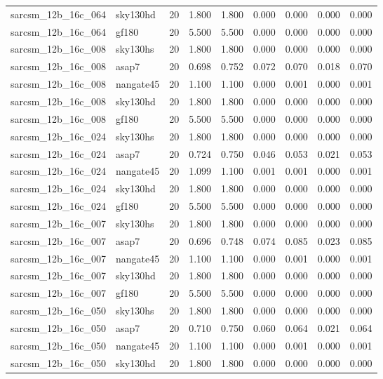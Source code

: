 \begin{tabular}{llrrrrrrr}
sarcsm\_12b\_16c\_064 & sky130hd & 20 & 1.800 & 1.800 & 0.000 & 0.000 & 0.000 & 0.000 \\
sarcsm\_12b\_16c\_064 & gf180 & 20 & 5.500 & 5.500 & 0.000 & 0.000 & 0.000 & 0.000 \\
sarcsm\_12b\_16c\_008 & sky130hs & 20 & 1.800 & 1.800 & 0.000 & 0.000 & 0.000 & 0.000 \\
sarcsm\_12b\_16c\_008 & asap7 & 20 & 0.698 & 0.752 & 0.072 & 0.070 & 0.018 & 0.070 \\
sarcsm\_12b\_16c\_008 & nangate45 & 20 & 1.100 & 1.100 & 0.000 & 0.001 & 0.000 & 0.001 \\
sarcsm\_12b\_16c\_008 & sky130hd & 20 & 1.800 & 1.800 & 0.000 & 0.000 & 0.000 & 0.000 \\
sarcsm\_12b\_16c\_008 & gf180 & 20 & 5.500 & 5.500 & 0.000 & 0.000 & 0.000 & 0.000 \\
sarcsm\_12b\_16c\_024 & sky130hs & 20 & 1.800 & 1.800 & 0.000 & 0.000 & 0.000 & 0.000 \\
sarcsm\_12b\_16c\_024 & asap7 & 20 & 0.724 & 0.750 & 0.046 & 0.053 & 0.021 & 0.053 \\
sarcsm\_12b\_16c\_024 & nangate45 & 20 & 1.099 & 1.100 & 0.001 & 0.001 & 0.000 & 0.001 \\
sarcsm\_12b\_16c\_024 & sky130hd & 20 & 1.800 & 1.800 & 0.000 & 0.000 & 0.000 & 0.000 \\
sarcsm\_12b\_16c\_024 & gf180 & 20 & 5.500 & 5.500 & 0.000 & 0.000 & 0.000 & 0.000 \\
sarcsm\_12b\_16c\_007 & sky130hs & 20 & 1.800 & 1.800 & 0.000 & 0.000 & 0.000 & 0.000 \\
sarcsm\_12b\_16c\_007 & asap7 & 20 & 0.696 & 0.748 & 0.074 & 0.085 & 0.023 & 0.085 \\
sarcsm\_12b\_16c\_007 & nangate45 & 20 & 1.100 & 1.100 & 0.000 & 0.001 & 0.000 & 0.001 \\
sarcsm\_12b\_16c\_007 & sky130hd & 20 & 1.800 & 1.800 & 0.000 & 0.000 & 0.000 & 0.000 \\
sarcsm\_12b\_16c\_007 & gf180 & 20 & 5.500 & 5.500 & 0.000 & 0.000 & 0.000 & 0.000 \\
sarcsm\_12b\_16c\_050 & sky130hs & 20 & 1.800 & 1.800 & 0.000 & 0.000 & 0.000 & 0.000 \\
sarcsm\_12b\_16c\_050 & asap7 & 20 & 0.710 & 0.750 & 0.060 & 0.064 & 0.021 & 0.064 \\
sarcsm\_12b\_16c\_050 & nangate45 & 20 & 1.100 & 1.100 & 0.000 & 0.001 & 0.000 & 0.001 \\
sarcsm\_12b\_16c\_050 & sky130hd & 20 & 1.800 & 1.800 & 0.000 & 0.000 & 0.000 & 0.000 \\

\end{tabular}

